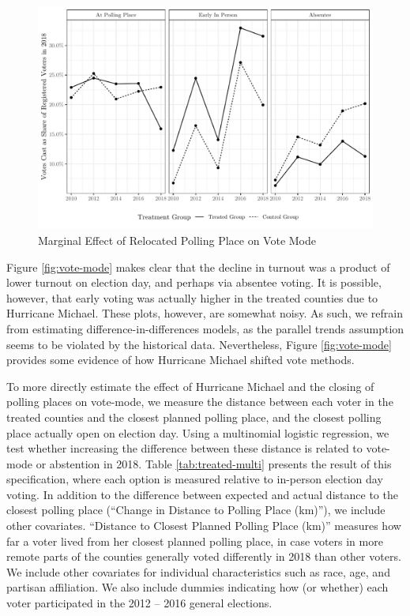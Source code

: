 \documentclass[
  12pt,
]{article}
\begin{document}
\begin{figure}[H]

{\centering \includegraphics{hurricane_michael_files/figure-latex/vote-mode-chunk-1} 

}

\caption{\label{fig:vote-mode}Marginal Effect of Relocated Polling Place on Vote Mode}\label{fig:vote-mode-chunk}
\end{figure}

Figure \ref{fig:vote-mode} makes clear that the decline in turnout was a product of lower turnout on election day, and perhaps via absentee voting. It is possible, however, that early voting was actually higher in the treated counties due to Hurricane Michael. These plots, however, are somewhat noisy. As such, we refrain from estimating difference-in-differences models, as the parallel trends assumption seems to be violated by the historical data. Nevertheless, Figure \ref{fig:vote-mode} provides some evidence of how Hurricane Michael shifted vote methods.

To more directly estimate the effect of Hurricane Michael and the closing of polling places on vote-mode, we measure the distance between each voter in the treated counties and the closest planned polling place, and the closest polling place actually open on election day. Using a multinomial logistic regression, we test whether increasing the difference between these distance is related to vote-mode or abstention in 2018. Table \ref{tab:treated-multi} presents the result of this specification, where each option is measured relative to in-person election day voting. In addition to the difference between expected and actual distance to the closest polling place (``Change in Distance to Polling Place (km)''), we include other covariates. ``Distance to Closest Planned Polling Place (km)'' measures how far a voter lived from her closest planned polling place, in case voters in more remote parts of the counties generally voted differently in 2018 than other voters. We include other covariates for individual characteristics such as race, age, and partisan affiliation. We also include dummies indicating how (or whether) each voter participated in the 2012 -- 2016 general elections.
\end{document}
